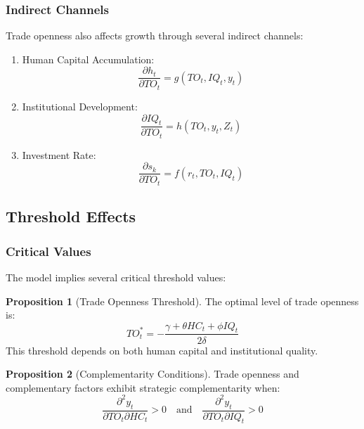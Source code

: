\documentclass[12pt,a4paper]{article}
\theoremstyle{definition}
\newtheorem{proposition}{Proposition}
\begin{document}
\subsubsection{Indirect Channels}
Trade openness also affects growth through several indirect channels:

\begin{enumerate}
    \item Human Capital Accumulation:
    \begin{equation}
    \frac{\partial h_t}{\partial TO_t} = g(TO_t, IQ_t, y_t)
    \end{equation}
    
    \item Institutional Development:
    \begin{equation}
    \frac{\partial IQ_t}{\partial TO_t} = h(TO_t, y_t, Z_t)
    \end{equation}
    
    \item Investment Rate:
    \begin{equation}
    \frac{\partial s_k}{\partial TO_t} = f(r_t, TO_t, IQ_t)
    \end{equation}
\end{enumerate}

\subsection{Threshold Effects}
\subsubsection{Critical Values}
The model implies several critical threshold values:

\begin{proposition}[Trade Openness Threshold]
The optimal level of trade openness is:
\begin{equation}
TO_t^* = -\frac{\gamma + \theta HC_t + \phi IQ_t}{2\delta}
\end{equation}
This threshold depends on both human capital and institutional quality.
\end{proposition}

\begin{proposition}[Complementarity Conditions]
Trade openness and complementary factors exhibit strategic complementarity when:
\begin{equation}
\frac{\partial^2 y_t}{\partial TO_t \partial HC_t} > 0 \quad \text{and} \quad \frac{\partial^2 y_t}{\partial TO_t \partial IQ_t} > 0
\end{equation}
\end{proposition}
\end{document}
